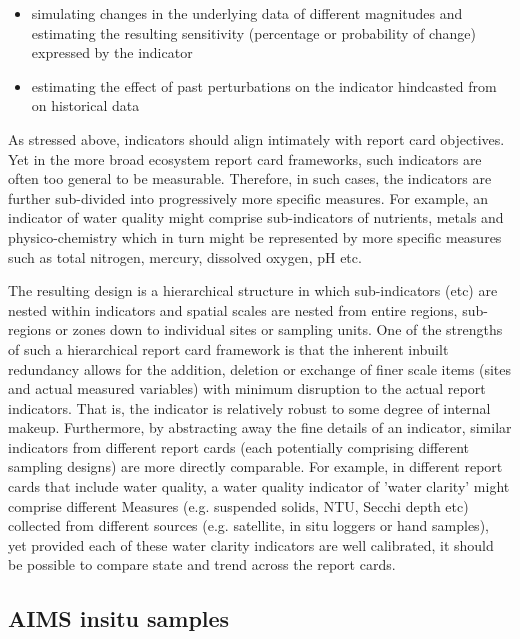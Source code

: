 \begin{itemize}
\item simulating changes in the underlying data of different magnitudes and estimating the resulting
sensitivity (percentage or probability of change) expressed by the indicator
\item estimating the effect of past perturbations on the indicator hindcasted from on historical
data
\end{itemize}

As stressed above, indicators should align intimately with report card objectives.  Yet in the more
broad ecosystem report card frameworks, such indicators are often too general to be measurable.
Therefore, in such cases, the indicators are further sub-divided into progressively more specific
measures.  For example, an indicator of water quality might comprise sub-indicators of nutrients,
metals and physico-chemistry which in turn might be represented by more specific measures such as
total nitrogen, mercury, dissolved oxygen, pH etc.

The resulting design is a hierarchical structure in which sub-indicators (etc) are nested within
indicators and spatial scales are nested from entire regions, sub-regions or zones down to
individual sites or sampling units.  One of the strengths of such a hierarchical report card
framework is that the inherent inbuilt redundancy allows for the addition, deletion or exchange of
finer scale items (sites and actual measured variables) with minimum disruption to the actual report
indicators.  That is, the indicator is relatively robust to some degree of internal makeup.
Furthermore, by abstracting away the fine details of an indicator, similar indicators from different
report cards (each potentially comprising different sampling designs) are more directly comparable.
For example, in different report cards that include water quality, a water quality indicator of
'water clarity' might comprise different Measures (e.g. suspended solids, NTU, Secchi depth etc)
collected from different sources (e.g. satellite, in situ loggers or hand samples), yet provided
each of these water clarity indicators are well calibrated, it should be possible to compare state
and trend across the report cards.
  
   
   
  
\subsection{AIMS insitu samples}

